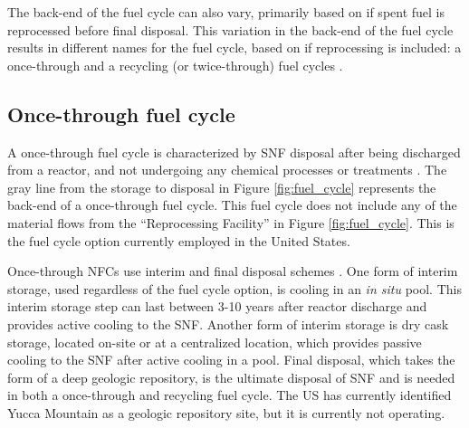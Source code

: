 The back-end of the fuel cycle can also vary, primarily based on if spent 
fuel is reprocessed before final disposal. This variation in the 
back-end of the fuel cycle results in different names for the fuel 
cycle, based on if reprocessing is included: a once-through and a recycling 
(or twice-through) fuel cycles \cite{tsoulfanidis_nuclear_2013}. 

\subsection{Once-through fuel cycle}
A once-through fuel cycle is characterized by \gls{SNF} disposal
after being discharged from a reactor, and not undergoing any chemical processes 
or treatments \cite{rodriguez-penalonga_review_2017}. The gray line from 
the storage to disposal in Figure \ref{fig:fuel_cycle} represents 
the back-end of a once-through fuel cycle. This fuel cycle does 
not include any of the material flows from the ``Reprocessing Facility'' 
in Figure \ref{fig:fuel_cycle}.
This is the fuel cycle option currently employed in the 
United States. 

Once-through \glspl{NFC} use interim and final disposal schemes
\cite{rodriguez-penalonga_review_2017}. One form of interim 
storage, used regardless of 
the fuel cycle option, is cooling in an \textit{in situ} pool. 
This interim storage step can last between 3-10 years after reactor 
discharge \cite{rodriguez-penalonga_review_2017}
and provides active cooling to the \gls{SNF}.
Another form of interim storage is dry cask storage, located 
on-site or at a centralized location, which provides passive 
cooling to the \gls{SNF} after active cooling in a pool. 
Final disposal, which takes the form of a 
deep geologic repository, is the ultimate disposal of \gls{SNF} and 
is needed in both a once-through and recycling fuel cycle. The 
US has currently identified Yucca Mountain as a geologic repository 
site, but it is currently not operating.  


